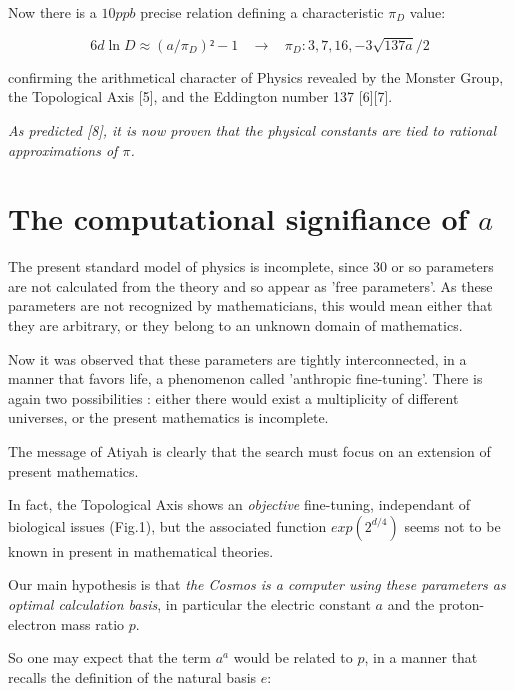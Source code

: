 \documentclass[a4paper,9pt]{article}
\begin{document}
  
Now there is a $10 ppb$ precise relation defining a characteristic $\pi_D$  value:
  
\begin{equation}
 6d\ln{D} \approx (a/\pi_D)² - 1 ~~~~\rightarrow  ~~~~ \pi_D : 3,7,16,-3\sqrt{137a}/2
\end{equation}  
 

confirming the arithmetical character of Physics revealed by the Monster Group, the Topological Axis [5], and the Eddington number 137 [6][7]. 


\textit{As predicted [8], it is now proven that the physical constants are tied to rational approximations of $\pi$.}


   
   
   \section{The computational signifiance of $a$}
   
         The present standard model of physics is incomplete, since 30 or so parameters are not calculated from the theory and so appear as 'free parameters'. As these parameters are not recognized by mathematicians, this would mean either that they are arbitrary, or they belong to an unknown domain of mathematics. 
         
         
         Now it was observed that these parameters are tightly interconnected, in a manner that favors life, a phenomenon called 'anthropic fine-tuning'. There is again two possibilities : either there would exist a multiplicity of different universes, or the present mathematics is incomplete.
         
         
         The message of Atiyah is clearly that the search must focus on an extension of present mathematics.
         
         
         In fact, the Topological Axis shows an \textit {objective} fine-tuning, independant of biological issues (Fig.1), but the associated function $exp(2^{d/4})$ seems not to be known in present in mathematical theories.
   
         
         
         Our main hypothesis is that \textit {the Cosmos is a computer using these parameters as optimal calculation basis},
         in particular the electric constant $a$ and the proton-electron mass ratio $p$.
         
         
        So one may expect that the term $a^a$ would be related to $p$, in a manner that recalls the definition of the natural basis $e$:
         
\end{document}
